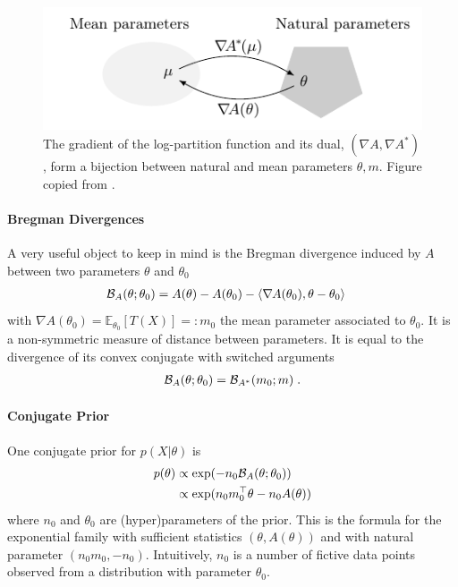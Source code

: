 \documentclass[twoside]{article}
\newcommand*{\expect}[2][]{\ensuremath{\mathbb{E}_{#1} \left[ #2 \right] }} %
\newcommand{\logpart}{A}
\newcommand{\conj}{\logpart^*}
\newcommand{\bregman}{\cB_\logpart}
\newcommand{\bregmanconj}{\cB_{\logpart^*}}
\newcommand{\nat}{\theta}
\newcommand{\m}{m}
\newcommand{\meanp}{\m}
\begin{document}
\begin{figure}[ht]
	\centering
	\includegraphics{duality}
	\caption{The gradient of the log-partition function and its dual, $(\nabla \logpart, \nabla \conj)$, form a bijection between natural and mean parameters $\nat, \meanp$. Figure copied from \citet{kunstner2020homeomorphic}. %
	}
	\label{fig:duality}
\end{figure}

\paragraph{Bregman Divergences}
A very useful object to keep in mind is the Bregman divergence induced by $\logpart$ between two parameters $\nat$ and $\nat_0$
\begin{align}
    \bregman (\nat ; \nat_0)
    & = \logpart(\nat) - \logpart(\nat_0) 
    - \langle \nabla \logpart(\nat_0)  , \nat - \nat_0 \rangle
\end{align}
with $\nabla \logpart(\nat_0) = \expect[\nat_0]{T(X)} =: \meanp_0$ the mean parameter associated to $\nat_0$. 
It is a non-symmetric measure of distance between parameters.
It is equal to the divergence of its convex conjugate with switched arguments
\begin{align}
	\bregman (\nat ; \nat_0)
    = \bregmanconj ( \meanp_0 ; \meanp) \; .
\end{align}

\paragraph{Conjugate Prior}
One conjugate prior \citep{agarwal2010geometric} for $p(X|\nat)$ is
\begin{align}
    p(\nat) 
    &\propto \exp( - n_0 \bregman(\nat ; \nat_0) ) \\
    &\propto \exp(n_0 \m_0^\top \nat - n_0 \logpart(\nat))
\end{align}
where $n_0$ and $\nat_0$ are (hyper)parameters of the prior.
This is the formula for the exponential family with sufficient statistics $(\nat ,\logpart(\nat))$ and with natural parameter $(n_0 \m_0, -n_0)$.
Intuitively, $n_0$ is a number of fictive data points observed from a distribution with parameter $\nat_0$.
\end{document}

